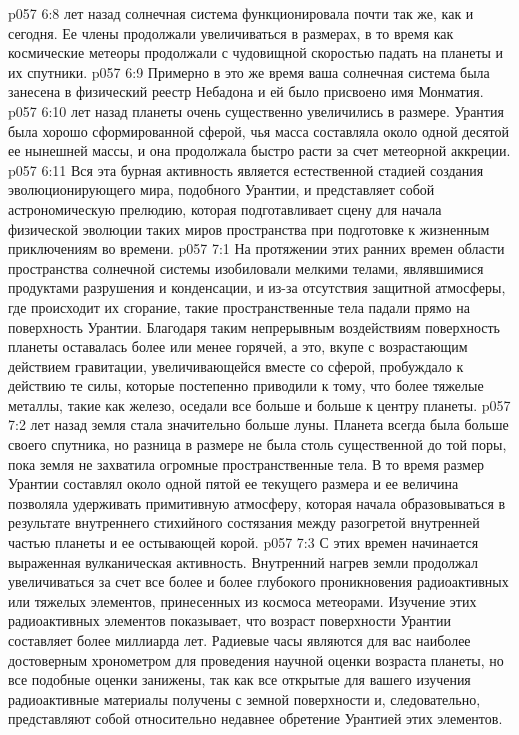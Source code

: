 \vs p057 6:8 \pc {} лет назад солнечная система функционировала почти так же, как и сегодня. Ее члены продолжали увеличиваться в размерах, в то время как космические метеоры продолжали с чудовищной скоростью падать на планеты и их спутники.
\vs p057 6:9 Примерно в это же время ваша солнечная система была занесена в физический реестр Небадона и ей было присвоено имя Монматия.
\vs p057 6:10 \pc {} лет назад планеты очень существенно увеличились в размере. Урантия была хорошо сформированной сферой, чья масса составляла около одной десятой ее нынешней массы, и она продолжала быстро расти за счет метеорной аккреции.
\vs p057 6:11 Вся эта бурная активность является естественной стадией создания эволюционирующего мира, подобного Урантии, и представляет собой астрономическую прелюдию, которая подготавливает сцену для начала физической эволюции таких миров пространства при подготовке к жизненным приключениям во времени.
\vs p057 7:1 На протяжении этих ранних времен области пространства солнечной системы изобиловали мелкими телами, являвшимися продуктами разрушения и конденсации, и из\hyp{}за отсутствия защитной атмосферы, где происходит их сгорание, такие пространственные тела падали прямо на поверхность Урантии. Благодаря таким непрерывным воздействиям поверхность планеты оставалась более или менее горячей, а это, вкупе с возрастающим действием гравитации, увеличивающейся вместе со сферой, пробуждало к действию те силы, которые постепенно приводили к тому, что более тяжелые металлы, такие как железо, оседали все больше и больше к центру планеты.
\vs p057 7:2 \pc {} лет назад земля стала значительно больше луны. Планета всегда была больше своего спутника, но разница в размере не была столь существенной до той поры, пока земля не захватила огромные пространственные тела. В то время размер Урантии составлял около одной пятой ее текущего размера и ее величина позволяла удерживать примитивную атмосферу, которая начала образовываться в результате внутреннего стихийного состязания между разогретой внутренней частью планеты и ее остывающей корой.
\vs p057 7:3 С этих времен начинается выраженная вулканическая активность. Внутренний нагрев земли продолжал увеличиваться за счет все более и более глубокого проникновения радиоактивных или тяжелых элементов, принесенных из космоса метеорами. Изучение этих радиоактивных элементов показывает, что возраст поверхности Урантии составляет более миллиарда лет. Радиевые часы являются для вас наиболее достоверным хронометром для проведения научной оценки возраста планеты, но все подобные оценки занижены, так как все открытые для вашего изучения радиоактивные материалы получены с земной поверхности и, следовательно, представляют собой относительно недавнее обретение Урантией этих элементов.
